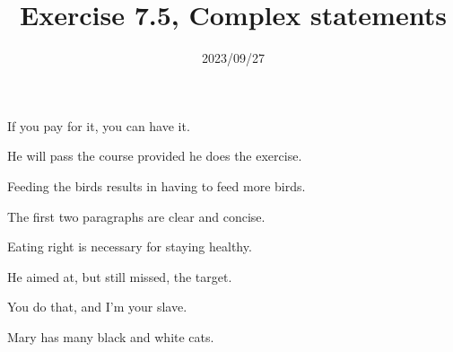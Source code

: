 
\title{Exercise 7.5, Complex statements}
\date{2023/09/27}

\maketitle

\begin{enumerate}

\begin{statement}{If you pay for it, you can have it.}
\end{statement}

\begin{statement}{He will pass the course provided he does the exercise.}
\end{statement}

\begin{statement}{Feeding the birds results in having to feed more birds.}
\end{statement}

\begin{statement}{The first two paragraphs are clear and concise.}
\end{statement}

\begin{statement}{Eating right is necessary for staying healthy.}
\end{statement}

\begin{statement}{He aimed at, but still missed, the target.}
\end{statement}

\begin{statement}{You do that, and I’m your slave.}
\end{statement}

\begin{statement}{Mary has many black and white cats.}
\end{statement}


\end{enumerate}
